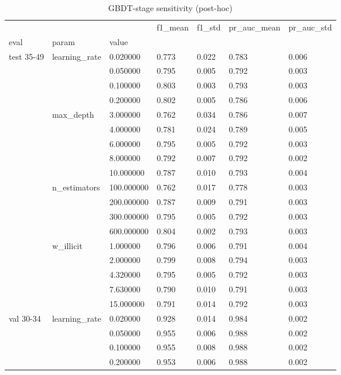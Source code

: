\begin{table}
\caption{GBDT-stage sensitivity (post-hoc)}
\label{tab:03_sensitivity}
\begin{tabular}{lllllll}
\toprule
 &  &  & f1\_mean & f1\_std & pr\_auc\_mean & pr\_auc\_std \\
eval & param & value &  &  &  &  \\
\midrule
\multirow[t]{18}{*}{test 35-49} & \multirow[t]{4}{*}{learning\_rate} & 0.020000 & 0.773 & 0.022 & 0.783 & 0.006 \\
 &  & 0.050000 & 0.795 & 0.005 & 0.792 & 0.003 \\
 &  & 0.100000 & 0.803 & 0.003 & 0.793 & 0.003 \\
 &  & 0.200000 & 0.802 & 0.005 & 0.786 & 0.006 \\
\cline{2-7}
 & \multirow[t]{5}{*}{max\_depth} & 3.000000 & 0.762 & 0.034 & 0.786 & 0.007 \\
 &  & 4.000000 & 0.781 & 0.024 & 0.789 & 0.005 \\
 &  & 6.000000 & 0.795 & 0.005 & 0.792 & 0.003 \\
 &  & 8.000000 & 0.792 & 0.007 & 0.792 & 0.002 \\
 &  & 10.000000 & 0.787 & 0.010 & 0.793 & 0.004 \\
\cline{2-7}
 & \multirow[t]{4}{*}{n\_estimators} & 100.000000 & 0.762 & 0.017 & 0.778 & 0.003 \\
 &  & 200.000000 & 0.787 & 0.009 & 0.791 & 0.003 \\
 &  & 300.000000 & 0.795 & 0.005 & 0.792 & 0.003 \\
 &  & 600.000000 & 0.804 & 0.002 & 0.793 & 0.003 \\
\cline{2-7}
 & \multirow[t]{5}{*}{w\_illicit} & 1.000000 & 0.796 & 0.006 & 0.791 & 0.004 \\
 &  & 2.000000 & 0.799 & 0.008 & 0.794 & 0.003 \\
 &  & 4.320000 & 0.795 & 0.005 & 0.792 & 0.003 \\
 &  & 7.630000 & 0.790 & 0.010 & 0.791 & 0.003 \\
 &  & 15.000000 & 0.791 & 0.014 & 0.792 & 0.003 \\
\cline{1-7} \cline{2-7}
\multirow[t]{18}{*}{val 30-34} & \multirow[t]{4}{*}{learning\_rate} & 0.020000 & 0.928 & 0.014 & 0.984 & 0.002 \\
 &  & 0.050000 & 0.955 & 0.006 & 0.988 & 0.002 \\
 &  & 0.100000 & 0.955 & 0.008 & 0.988 & 0.002 \\
 &  & 0.200000 & 0.953 & 0.006 & 0.988 & 0.002 \\

\end{tabular}
\end{table}
